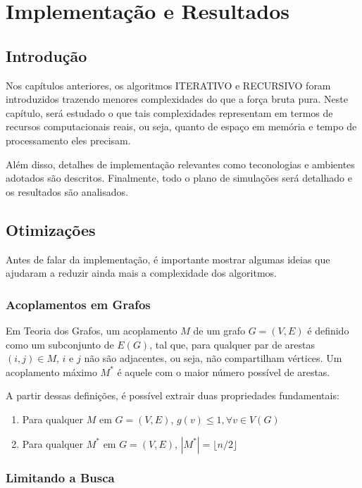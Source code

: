 \chapter{Implementação e Resultados}
\label{cap:resultados}

\section{Introdução}

Nos capítulos anteriores, os algoritmos ITERATIVO e RECURSIVO foram introduzidos trazendo menores complexidades do que a força bruta pura. Neste capítulo, será estudado o que tais complexidades representam em termos de recursos computacionais reais, ou seja, quanto de espaço em memória e tempo de processamento eles precisam. 

Além disso, detalhes de implementação relevantes como teconologias e ambientes adotados são descritos. Finalmente, todo o plano de simulações será detalhado e os resultados são analisados.

\section{Otimizações}

Antes de falar da implementação, é importante mostrar algumas ideias que ajudaram a reduzir ainda mais a complexidade dos algoritmos.

\subsection{Acoplamentos em Grafos}

Em Teoria dos Grafos, um acoplamento $M$ de um grafo $G=(V,E)$ é definido como um subconjunto de $E(G)$, tal que, para qualquer par de arestas $(i,j) \in M$, $i$ e $j$ não são adjacentes, ou seja, não compartilham vértices. Um acoplamento máximo $M^*$ é aquele com o maior número possível de arestas. 

A partir dessas definições, é possível extrair duas propriedades fundamentais:
\begin{enumerate}
\item Para qualquer $M$ em $G=(V,E)$, $g(v) \leq 1, \forall v \in V(G)$
\item Para qualquer $M^*$ em $G=(V,E)$, $|M^*|= \lfloor n/2 \rfloor$
\end{enumerate}

\subsection{Limitando a Busca}

